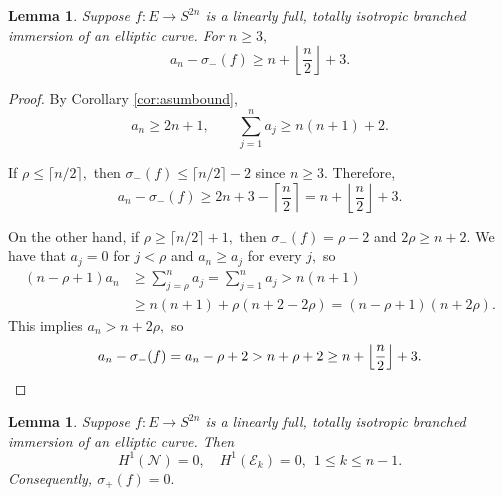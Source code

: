 \documentclass[11pt]{article}
\newtheorem{lemma}[theorem]{Lemma}
\theoremstyle{definition}
\numberwithin{equation}{section}
\begin{document}
\begin{lemma}\label{lem:g1asigbound}
    Suppose $f: E \to S^{2n}$ is a linearly full, totally isotropic branched immersion of an elliptic curve. For $n \geq 3,$
    \begin{equation*}
        a_n - \sigma_-(f) \geq  n + \left\lfloor\frac{n}{2} \right\rfloor + 3.
    \end{equation*}
\end{lemma}

\begin{proof}
    By Corollary \ref{cor:asumbound},
    \begin{equation*}
        a_n \geq 2n+1, \qquad \sum_{j=1}^n a_j \geq n(n+1)+2.
    \end{equation*}
    
    If $\rho \leq \lceil n / 2 \rceil,$ then $\sigma_-(f) \leq \lceil n/2\rceil-2$ since $n \geq 3.$ Therefore,
    \begin{equation*}
        a_n-\sigma_-(f) \geq 2n + 3 - \left\lceil \frac{n}{2} \right\rceil = n + \left\lfloor \frac{n}{2} \right\rfloor + 3.
    \end{equation*}
    
    On the other hand, if $\rho \geq \lceil n / 2 \rceil + 1,$ then $\sigma_-(f)=\rho-2$ and $2\rho\geq n+2$. We have that $a_j=0$ for $j<\rho$ and  $a_n \geq a_j$ for every $j,$ so
    \begin{equation*}
    \begin{aligned}
        (n-\rho+1)a_n &\geq \sum_{j=\rho}^n a_j = \sum_{j=1}^n a_j
        > n(n+1)\\
        &\geq n(n+1)+\rho(n+2-2\rho) =(n-\rho+1)(n+2\rho).
    \end{aligned}
    \end{equation*}
    This implies $a_n > n+2\rho,$ so
    \begin{equation*}
        a_n-\sigma_-(f) = a_n-\rho+2 > n+\rho + 2 \geq n + \left\lfloor\frac{n}{2} \right\rfloor + 3. \qedhere
    \end{equation*}
\end{proof}

\begin{lemma}\label{lem:g1cohomvanish}
    Suppose $f: E \to S^{2n}$ is a linearly full, totally isotropic branched immersion of an elliptic curve. Then
    \begin{equation*}
        H^1(\mathcal{N}) = 0, \quad H^1(\mathcal{E}_k) = 0, \:\: 1 \leq k \leq n-1.
    \end{equation*}
    Consequently, $\sigma_+(f) = 0.$
\end{lemma}
\end{document}
